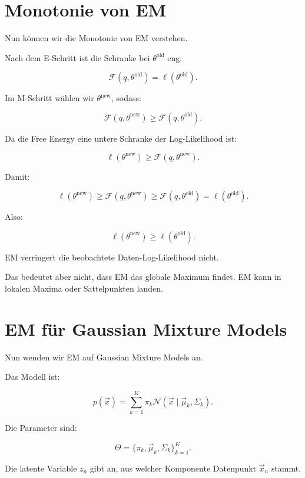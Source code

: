 \section{Monotonie von EM}

Nun können wir die Monotonie von EM verstehen.

Nach dem E-Schritt ist die Schranke bei \(\theta^{\mathrm{old}}\) eng:

\[
    \mathcal{F}(q,\theta^{\mathrm{old}})
    =
    \ell(\theta^{\mathrm{old}}).
\]

Im M-Schritt wählen wir \(\theta^{\mathrm{new}}\), sodass:

\[
    \mathcal{F}(q,\theta^{\mathrm{new}})
    \geq
    \mathcal{F}(q,\theta^{\mathrm{old}}).
\]

Da die Free Energy eine untere Schranke der Log-Likelihood ist:

\[
    \ell(\theta^{\mathrm{new}})
    \geq
    \mathcal{F}(q,\theta^{\mathrm{new}}).
\]

Damit:

\[
    \ell(\theta^{\mathrm{new}})
    \geq
    \mathcal{F}(q,\theta^{\mathrm{new}})
    \geq
    \mathcal{F}(q,\theta^{\mathrm{old}})
    =
    \ell(\theta^{\mathrm{old}}).
\]

Also:

\[
    \ell(\theta^{\mathrm{new}})
    \geq
    \ell(\theta^{\mathrm{old}}).
\]

\begin{conceptbox}
EM verringert die beobachtete Daten-Log-Likelihood nicht.

Das bedeutet aber nicht, dass EM das globale Maximum findet.
EM kann in lokalen Maxima oder Sattelpunkten landen.
\end{conceptbox}

\section{EM für Gaussian Mixture Models}

Nun wenden wir EM auf Gaussian Mixture Models an.

Das Modell ist:

\[
    p(\vec{x})
    =
    \sum_{k=1}^{K}
    \pi_k
    \mathcal{N}(\vec{x}\mid\vec{\mu}_k,\Sigma_k).
\]

Die Parameter sind:

\[
    \Theta
    =
    \{\pi_k,\vec{\mu}_k,\Sigma_k\}_{k=1}^{K}.
\]

Die latente Variable \(z_n\) gibt an, aus welcher Komponente Datenpunkt \(\vec{x}_n\) stammt.

